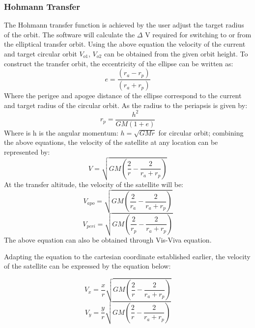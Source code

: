 \documentclass[12pt, letter]{article}
\begin{document}
\subsubsection {Hohmann Transfer}
The Hohmann transfer function is achieved by the user adjust the target radius of the orbit.  The software will calculate the $\Delta$ V required for switching to or from the elliptical transfer orbit.  
Using the above equation the velocity of the current and target circular orbit $V_{o1}$, $V_{o2}$ can be obtained from the given orbit height. To construct the transfer orbit, the eccentricity of the ellipse can be written as: 
\begin{equation} \label{eccentricity}
e=\frac{(r_a-r_p)}{(r_a+r_p )}
\end{equation}
Where the perigee and apogee distance of the ellipse correspond to the current and target radius of the circular orbit. As the radius to the periapsis is given by:
\begin{equation} \label{periapsis}
r_p=\frac{h^2}{GM(1+e)}
\end{equation}
Where is h is the angular momentum: $ h=\sqrt{GMr} $ for circular orbit; combining the above equations, the velocity of the satellite at any location can be represented by:
\begin{equation} \label{transfer orbit velocity}
V=\sqrt{GM(\frac{2}{r}-\frac{2}{r_a+r_p })}
\end{equation}
At the transfer altitude, the velocity of the satellite will be:
\begin{equation} \label{apogee velocity}
V_{apo}=\sqrt{GM(\frac{2}{r_a}-\frac{2}{r_a+r_p })}
\end{equation}
\begin{equation} \label{perigee velocity}
V_{peri}=\sqrt{GM(\frac{2}{r_p}-\frac{2}{r_a+r_p })}
\end{equation}
The above equation can also be obtained through Vis-Viva equation.

Adapting the equation to the cartesian coordinate established earlier, the velocity of the satellite can be expressed by the equation below:

\begin{equation} \label{eq:velocity_X}
V_x=\frac{x}{r}\sqrt{GM(\frac{2}{r}-\frac{2}{r_a+r_p })}
\end{equation}
\begin{equation} \label{eq:velocity_Y}
V_y=\frac{y}{r}\sqrt{GM(\frac{2}{r}-\frac{2}{r_a+r_p })}
\end{equation}
\end{document}
